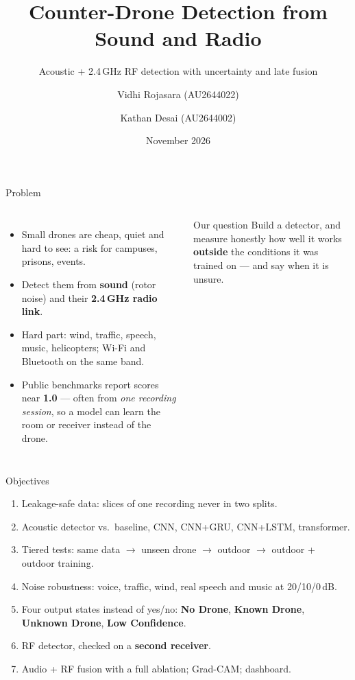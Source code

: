 \documentclass[aspectratio=169,11pt]{beamer}
\title[Counter-Drone Detection]{Counter-Drone Detection from Sound and Radio}
\subtitle{Acoustic + 2.4\,GHz RF detection with uncertainty and late fusion}
\author[Vidhi.R \& Kathan.D ]{Vidhi Rojasara (AU2644022) \and Kathan Desai (AU2644002)}
\institute[Ahmedabad University]{AI Lab --- Prof.\ Maitrik Shah\\Ahmedabad University, Ahmedabad}
\date{November 2026}
\begin{document}
\begin{frame}
  \titlepage
\end{frame}

\begin{frame}{Problem}
\begin{columns}[T]
\begin{itemize}
  \item Small drones are cheap, quiet and hard to see: a risk for campuses, prisons, events.
  \item Detect them from \textbf{sound} (rotor noise) and their \textbf{2.4\,GHz radio link}.
  \item Hard part: wind, traffic, speech, music, helicopters; Wi-Fi and Bluetooth on the same band.
  \item Public benchmarks report scores near \textbf{1.0} --- often from \emph{one recording session},
        so a model can learn the room or receiver instead of the drone.
\end{itemize}
\begin{alertblock}{Our question}
Build a detector, and measure honestly how well it works \textbf{outside} the conditions it was
trained on --- and say when it is unsure.
\end{alertblock}
\end{columns}
\end{frame}

\begin{frame}{Objectives}
\begin{enumerate}
  \item Leakage-safe data: slices of one recording never in two splits.
  \item Acoustic detector vs.\ baseline, CNN, CNN+GRU, CNN+LSTM, transformer.
  \item Tiered tests: same data $\rightarrow$ unseen drone $\rightarrow$ outdoor $\rightarrow$ outdoor + outdoor training.
  \item Noise robustness: voice, traffic, wind, real speech and music at 20/10/0\,dB.
  \item Four output states instead of yes/no: \textcolor{nogray}{\textbf{No Drone}},
        \textcolor{dronered}{\textbf{Known Drone}}, \textcolor{unkviolet}{\textbf{Unknown Drone}},
        \textcolor{lowamber}{\textbf{Low Confidence}}.
  \item RF detector, checked on a \textbf{second receiver}.
  \item Audio + RF fusion with a full ablation; Grad-CAM; dashboard.
\end{enumerate}
\end{frame}
\end{document}
